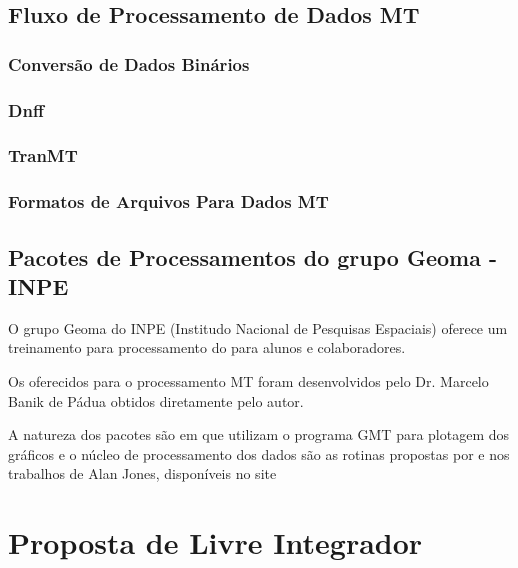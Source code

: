     
    \section{Fluxo de Processamento de Dados MT}
       
    
    
    
    \subsection{Conversão de Dados Binários}
    
    \subsection{Dnff}
    
    \subsection{TranMT}
    
    \subsection{Formatos de Arquivos Para Dados MT}
    
    \section{Pacotes de Processamentos do grupo Geoma - INPE}
    
        O grupo Geoma do INPE (Institudo Nacional de Pesquisas Espaciais) oferece um treinamento para processamento do \MT para alunos e colaboradores.
        
        Os  oferecidos para o processamento MT foram desenvolvidos pelo Dr. Marcelo Banik de Pádua obtidos diretamente pelo autor.
        
        A natureza dos pacotes são  em  que utilizam o programa GMT \cite{gmt} para plotagem dos gráficos e o núcleo de processamento dos dados são as rotinas propostas por \citeauthor{egbert97} e nos trabalhos de Alan Jones, disponíveis no site \citeauthor{mtnet}
    
    

    
    
    \chapter{Proposta de  Livre Integrador}
    
